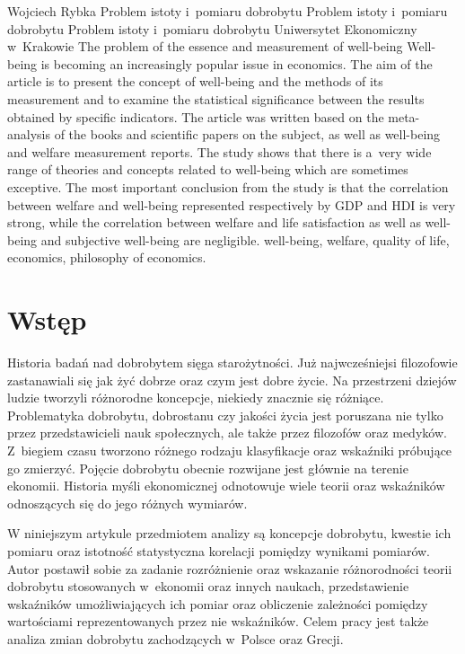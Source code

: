 \begin{artplenv}{Wojciech Rybka}
	{Problem istoty i~pomiaru dobrobytu}
	{Problem istoty i~pomiaru dobrobytu}
	{Problem istoty i~pomiaru dobrobytu}
	{Uniwersytet Ekonomiczny w~Krakowie}
	{The problem of the essence and measurement of well-being}
	{Well-being is becoming an increasingly popular issue in economics. The aim of the article is to present the concept of well-being and the methods of its measurement and to examine the statistical significance between the results obtained by specific indicators. The article was written based on the meta-analysis of the books and scientific papers on the subject, as well as well-being and welfare measurement reports. The study shows that there is a~very wide range of theories and concepts related to well-being which are sometimes exceptive. The most important conclusion from the study is that the correlation between welfare and well-being represented respectively by GDP and HDI is very strong, while the correlation between welfare and life satisfaction as well as well-being and subjective well-being are negligible.}
	{well-being, welfare, quality of life, economics, philosophy of economics.}



\section*{Wstęp}
\lettrine[loversize=0.13,lines=2,lraise=-0.05,nindent=0em,findent=0.2pt]%
{H}{}istoria badań nad dobrobytem sięga starożytności. Już najwcześniejsi filozofowie zastanawiali się jak żyć dobrze oraz
czym jest dobre życie. Na przestrzeni dziejów ludzie tworzyli różnorodne koncepcje, niekiedy znacznie się różniące.
Problematyka dobrobytu, dobrostanu czy jakości życia jest poruszana nie tylko przez przedstawicieli nauk społecznych,
ale także przez filozofów oraz medyków. Z~biegiem czasu tworzono różnego rodzaju klasyfikacje oraz wskaźniki próbujące
go zmierzyć. Pojęcie dobrobytu obecnie rozwijane jest głównie na terenie ekonomii. Historia myśli ekonomicznej
odnotowuje wiele teorii oraz wskaźników odnoszących się do jego różnych wymiarów.

W niniejszym artykule przedmiotem analizy są koncepcje dobrobytu, kwestie ich pomiaru oraz istotność statystyczna
korelacji pomiędzy wynikami pomiarów. Autor postawił sobie za zadanie rozróżnienie oraz wskazanie różnorodności teorii
dobrobytu stosowanych w~ekonomii oraz innych naukach, przedstawienie wskaźników umożliwiających ich pomiar oraz
obliczenie zależności pomiędzy wartościami reprezentowanych przez nie wskaźników. Celem pracy jest także analiza zmian
dobrobytu zachodzących w~Polsce oraz Grecji. 


\end{artplenv}
